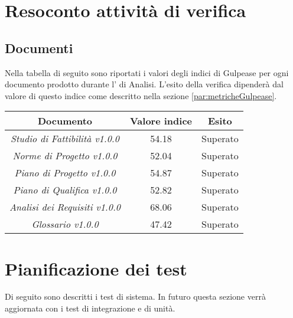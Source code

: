 \documentclass{scalatekids-article}
\begin{document}
\section{Resoconto attività di verifica}
\label{sec:resAttivitaVerifica}
\subsection{Documenti}
Nella tabella di seguito sono riportati i valori degli indici di Gulpease per ogni documento prodotto durante l' di Analisi. L'esito della verifica dipenderà dal valore di questo indice come descritto nella sezione \ref{par:metricheGulpease}.
\begin{center}
  \begin{tabular}{| c | c | c |}
    \hline
    Documento & Valore indice & Esito\\
    \hline
    \textit{Studio di Fattibilità v1.0.0} & 54.18 & Superato\\
    \textit{Norme di Progetto v1.0.0} & 52.04 & Superato\\
    \textit{Piano di Progetto v1.0.0} & 54.87 & Superato\\
    \textit{Piano di Qualifica v1.0.0} & 52.82 & Superato\\
    \textit{Analisi dei Requisiti v1.0.0} & 68.06 & Superato\\
    \textit{Glossario v1.0.0} & 47.42 & Superato\\
    \hline
  \end{tabular}
\end{center}
\newpage
\section{Pianificazione dei test}
Di seguito sono descritti i test di sistema. In futuro questa sezione verrà aggiornata con i test di integrazione e di unità.
\end{document}
